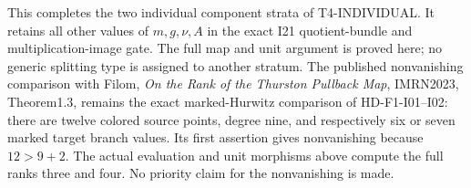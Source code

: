 This completes the two individual component strata of
T4-INDIVIDUAL. It retains all other values of $m,g,\nu,A$
in the exact I21 quotient-bundle and multiplication-image
gate. The full map and unit argument is proved here;
no generic splitting type is assigned to another stratum.
The published nonvanishing comparison with Filom,
\emph{On the Rank of the Thurston Pullback Map},
IMRN2023, Theorem1.3, remains the exact marked-Hurwitz
comparison of HD-F1-I01--I02: there are twelve colored
source points, degree nine, and respectively six or seven
marked target branch values. Its first assertion gives
nonvanishing because $12>9+2$. The actual evaluation
and unit morphisms above compute the full ranks three
and four. No priority claim for the nonvanishing is made.
